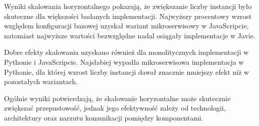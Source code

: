 \begin{table}[htbp]
    \centering
    \caption{Wyniki skalowania horyzontalnego dla badanych implementacji}
    \label{tab:horizontal-scaling-results}
    \renewcommand{\arraystretch}{1.15}
\end{table}

Wyniki skalowania horyzontalnego pokazują, że zwiększanie liczby instancji było skuteczne dla większości badanych implementacji. Najwyższy procentowy wzrost względem konfiguracji bazowej uzyskał wariant mikroserwisowy w JavaScripcie, natomiast najwyższe wartości bezwzględne nadal osiągały implementacje w Javie.

Dobre efekty skalowania uzyskano również dla monolitycznych implementacji w Pythonie i JavaScripcie. Najsłabiej wypadła mikroserwisowa implementacja w Pythonie, dla której wzrost liczby instancji dawał znacznie mniejszy efekt niż w pozostałych wariantach.

Ogólnie wyniki potwierdzają, że skalowanie horyzontalne może skutecznie zwiększać przepustowość, jednak jego efektywność zależy od technologii, architektury oraz narzutu komunikacji pomiędzy komponentami.

